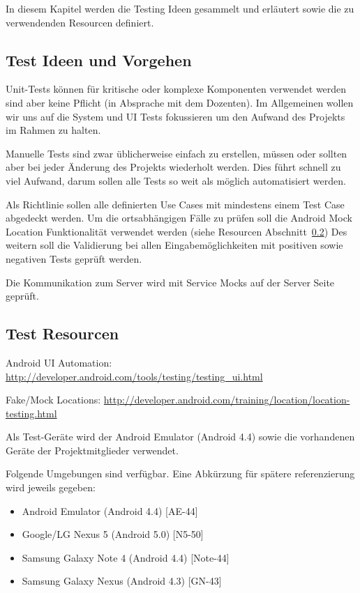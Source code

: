 In diesem Kapitel werden die Testing Ideen gesammelt und erläutert sowie die zu verwendenden Resourcen definiert.

\subsection{Test Ideen und Vorgehen}
Unit-Tests können für kritische oder komplexe Komponenten verwendet werden sind aber keine Pflicht (in Absprache mit dem Dozenten). 
Im Allgemeinen wollen wir uns auf die System und UI Tests fokussieren um den Aufwand des Projekts im Rahmen zu halten.

\medskip
Manuelle Tests sind zwar üblicherweise einfach zu erstellen, müssen oder sollten aber bei jeder Änderung des Projekts wiederholt werden. Dies führt schnell zu viel Aufwand, darum sollen alle Tests so weit als möglich automatisiert werden.

\medskip
Als Richtlinie sollen alle definierten Use Cases mit mindestens einem Test Case abgedeckt werden. Um die ortsabhängigen Fälle zu prüfen soll die Android Mock Location Funktionalität verwendet werden (siehe Resourcen Abschnitt~\ref{sec:test_resources})
Des weitern soll die Validierung bei allen Eingabemöglichkeiten mit positiven sowie negativen Tests geprüft werden.

\medskip
Die Kommunikation zum Server wird mit Service Mocks auf der Server Seite geprüft.

\subsection{Test Resourcen}
\label{sec:test_resources}
Android UI Automation: \url{http://developer.android.com/tools/testing/testing_ui.html}

Fake/Mock Locations: \url{http://developer.android.com/training/location/location-testing.html}

\medskip

Als Test-Geräte wird der Android Emulator (Android 4.4) sowie die vorhandenen Geräte der Projektmitglieder verwendet. 

\medskip
Folgende Umgebungen sind verfügbar. Eine Abkürzung für spätere referenzierung wird jeweils gegeben:

\begin{itemize}
\item Android Emulator (Android 4.4) [AE-44]
\item Google/LG Nexus 5 (Android 5.0) [N5-50]
\item Samsung Galaxy Note 4 (Android 4.4) [Note-44]
\item Samsung Galaxy Nexus (Android 4.3) [GN-43]
\end{itemize}

